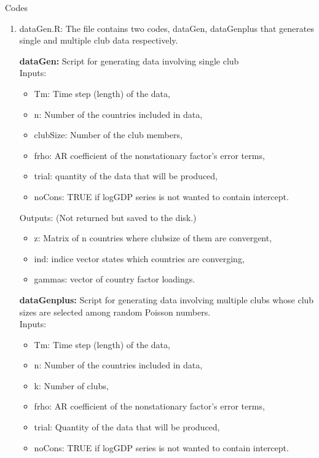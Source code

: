\documentclass{article}
\begin{document}
\begin{flushleft}
	\large Codes
\end{flushleft}
\begin{enumerate}
	\item dataGen.R: The file contains two codes, dataGen, dataGenplus that generates single and multiple club data respectively.


	 \textbf{dataGen:} Script for generating data involving single club \\
	 
	Inputs:
		 \begin{itemize}
		 	 
		 	\item Tm: Time step (length) of the data,
		 	\item n: Number of the countries included in data,
		 	\item clubSize: Number of the club members,
		 	\item frho: AR coefficient of the nonstationary factor's error terms,
		 	\item trial: quantity of the data that will be produced,
		 	\item noCons: TRUE if logGDP series is not wanted to contain intercept.
		 \end{itemize}
		 
	Outputs: (Not returned but saved to the disk.)
		 
		 \begin{itemize}
		 \item  z: Matrix of n countries where clubsize of them are convergent,
		 \item  ind: indice vector states which countries are converging,
		 \item  gammas: vector of country factor loadings.  
		 \end{itemize}

		 \textbf{dataGenplus:} Script for generating data involving multiple clubs whose club sizes are selected among random Poisson numbers. \\

	Inputs:
	\begin{itemize}
		
		\item Tm: Time step (length) of the data,
		\item n: Number of the countries included in data,
		\item k: Number of clubs, 
		\item frho: AR coefficient of the nonstationary factor's error terms,
		\item trial: Quantity of the data that will be produced,
		\item noCons: TRUE if logGDP series is not wanted to contain intercept.
	\end{itemize}
	

\end{enumerate}
\end{document}
